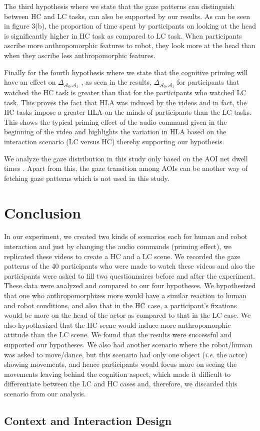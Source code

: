 \documentclass[a4,twocolumn,10pt]{article}
\newcommand{\ie}{\textit{i.e.}\xspace}
\newcommand{\deltaant}{{ $\Delta_{\mathcal{A}_0,\mathcal{A}_1}$ }}
\begin{document}
The third hypothesis where we state that the gaze patterns can distinguish
between HC and LC tasks, can also be supported by our results. As can be seen in
figure 3(b), the proportion of time spent by participants on looking at the head
is significantly higher in HC task as compared to LC task. When participants
ascribe more anthropomorphic features to robot, they look more at the head than
when they ascribe less anthropomorphic features.

Finally for the fourth hypothesis where we state that the cognitive priming will
have an effect on \deltaant, as seen in the results, \deltaant
for participants that watched the HC task is greater than that for the
participants who watched LC task. This proves the fact that HLA was induced by
the videos and in fact, the HC tasks impose a greater HLA on the minds of
participants than the LC tasks. This shows the typical priming effect of the
audio command given in the beginning of the video and highlights the variation
in HLA based on the interaction scenario (LC versus HC) thereby supporting our
hypothesis. 

We analyze the gaze distribution in this study only based on the AOI net dwell
times . Apart from this, the gaze transition among AOIs can be another way of
fetching gaze patterns which is not used in this study.

\section{Conclusion}

In our experiment, we created two kinds of scenarios each for human and
robot interaction and just by changing the audio commands (priming
effect), we replicated these videos to create a HC and a LC scene. We recorded
the gaze patterns of the 40 participants who were made to watch these videos and
also the participants were asked to fill two questionnaires before and after the
experiment. These data were analyzed and compared to our four hypotheses. We
hypothesized that one who anthropomorphizes more would have a similar reaction
to human and robot conditions, and also that in the HC case, a
participant's fixations would be more on the head of the actor as compared to
that in the LC case. We also hypothesized that the HC scene would induce more
anthropomorphic attitude than the LC scene. We found that the results were
successful and supported our hypotheses. We also had another scenario where the
robot/human was asked to move/dance, but this scenario had only one object
(\ie the actor) showing movements, and hence participants would focus
more on seeing the movements leaving behind the cognition aspect, which made it
difficult to differentiate between the LC and HC cases and, therefore, we
discarded this scenario from our analysis.

\subsection{Context and Interaction Design}





%
%
\end{document}
